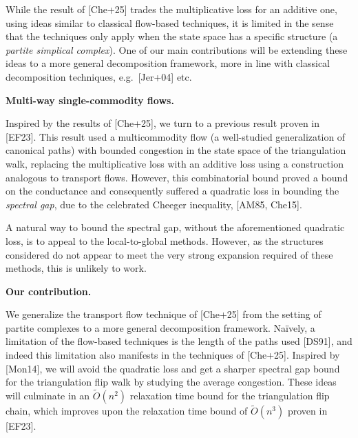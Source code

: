 While the result of [Che+25] trades the multiplicative loss for an additive one, using ideas similar to classical flow-based techniques, it is limited in the sense that the techniques only apply when the state space has a specific structure (a \emph{partite simplical complex}). One of our main contributions will be extending these ideas to a more general decomposition framework, more in line with classical decomposition techniques, e.g. [Jer+04] etc.\par





\par\medskip\noindent\textbf{Multi-way single-commodity flows.}\par




Inspired by the results of [Che+25], we turn to a previous result proven in
[EF23]. This result used a multicommodity flow (a well-studied generalization of canonical paths) with bounded congestion in the state space of the triangulation walk, replacing the multiplicative loss with an additive loss using a construction analogous to transport flows. However, this combinatorial bound proved a bound on the conductance and consequently suffered a quadratic loss in bounding the \emph{spectral gap}, due to the celebrated Cheeger inequality, [AM85, Che15].\par




A natural way to bound the spectral gap, without the aforementioned quadratic loss, is to appeal to the local-to-global methods. However, as the structures considered do not appear to meet the very strong expansion required of these methods, this is unlikely to work.\par





\par\medskip\noindent\textbf{Our contribution.}\par




We generalize the transport flow technique of [Che+25] from the setting of partite complexes to a more general decomposition framework. Naïvely, a limitation of the flow-based techniques is the length of the paths used [DS91], and indeed this limitation also manifests in the techniques of [Che+25]. Inspired by [Mon14], we will avoid the quadratic loss and get a sharper spectral gap bound for the triangulation flip walk by studying the average congestion. These ideas will culminate in an $\widetilde{O}(n^{2})$ relaxation time bound for the triangulation flip chain, which improves upon the relaxation time bound of $\widetilde{O}(n^{3})$ proven in [EF23].\par




